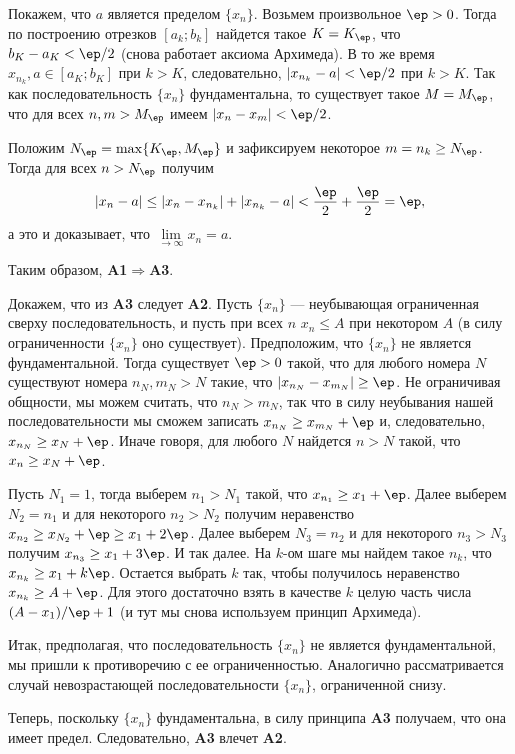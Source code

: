 \begin{enumerate}
Покажем, что $a$ является пределом $\{x_n\}$. Возьмем произвольное $\ep>0$. Тогда по 
построению отрезков $[a_k;b_k]$ найдется такое $K=K_\ep$, что $b_K-a_K<\ep/2$ (снова работает аксиома Архимеда). В то же время $x_{n_k},a\in[a_K;b_K]$ при $k>K$, следовательно, $|x_{n_k}-a|<\ep/2$ при $k>K$. Так как последовательность $\{x_n\}$ фундаментальна, то существует такое $M=M_\ep$, что для всех $n,m>M_\ep$ имеем $|x_n-x_m|<\ep/2$.

Положим $N_\ep = \max\{K_\ep,M_\ep\}$ и зафиксируем некоторое $m=n_k\ge N_\ep$. Тогда для всех $n>N_\ep$ получим
$$
|x_n-a|\le|x_n-x_{n_k}|+|x_{n_k}-a|<\frac{\ep}{2}+\frac{\ep}{2}=\ep,
$$
а это и доказывает, что $\lim\limits_{\to\infty}x_n=a$.

Таким образом, \textbf{A1}$\Rightarrow$\textbf{A3}.

Докажем, что из \textbf{A3} следует \textbf{A2}. Пусть $\{x_n\}$ --- неубывающая ограниченная сверху последовательность, и пусть при всех $n$ $x_n\le A$ при некотором $A$ (в силу ограниченности $\{x_n\}$ оно существует).
Предположим, что $\{x_n\}$ не является фундаментальной. Тогда существует $\ep>0$ такой, что для любого номера $N$ существуют номера $n_N, m_N>N$ такие, что $|x_{n_N}-x_{m_N}|\ge\ep$. Не ограничивая общности, мы можем считать, что $n_N>m_N$, так что в силу неубывания нашей последовательности мы сможем записать $x_{n_N}\ge x_{m_N}+\ep$ и, следовательно, $x_{n_N}\ge x_N+\ep$. Иначе говоря, для любого $N$ найдется $n>N$ такой, что $x_n\ge x_N+\ep$.

Пусть $N_1=1$, тогда выберем $n_1>N_1$ такой, что $x_{n_1}\ge x_{1}+\ep$. Далее выберем $N_2=n_1$ и для некоторого $n_2>N_2$ получим неравенство $x_{n_2}\ge x_{N_2}+\ep\ge x_1+2\ep$. Далее выберем $N_3=n_2$ и для некоторого $n_3>N_3$ получим $x_{n_3}\ge x_1+3\ep$. И так далее. На $k$-ом шаге мы найдем такое $n_k$, что $x_{n_k}\ge x_1+k\ep$. Остается выбрать $k$ так, чтобы получилось неравенство $x_{n_k}\ge A+\ep$. Для этого достаточно взять в качестве $k$ целую часть числа $(A-x_1)/\ep +1$ (и тут мы снова используем принцип Архимеда).

Итак, предполагая, что последовательность $\{x_n\}$ не является фундаментальной, мы пришли к противоречию с ее ограниченностью. Аналогично рассматривается случай невозрастающей последовательности $\{x_n\}$, ограниченной снизу.

Теперь, поскольку $\{x_n\}$ фундаментальна, в силу принципа \textbf{A3} получаем, что она имеет предел. Следовательно,  \textbf{A3} влечет \textbf{A2}.


\end{enumerate}
